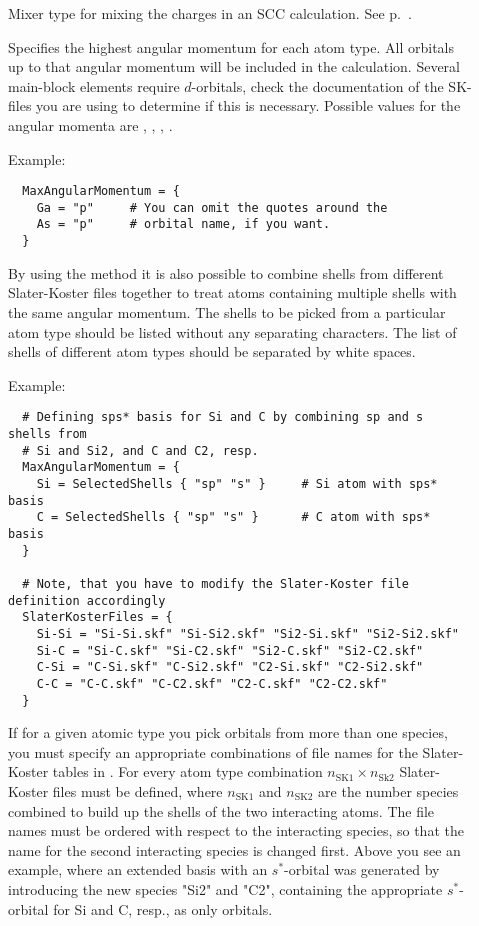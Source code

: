 \begin{description}
\item[]  Mixer type for mixing the charges in an SCC
  calculation. See p.~.

\item[] Specifies the highest angular momentum
  for each atom type. All orbitals up to that angular momentum will be
  included in the calculation. Several main-block elements require
  $d$-orbitals, check the documentation of the SK-files you are using
  to determine if this is necessary. Possible values for the angular
  momenta are , , , .

  Example:
\begin{verbatim}
  MaxAngularMomentum = {
    Ga = "p"     # You can omit the quotes around the
    As = "p"     # orbital name, if you want.
  }
\end{verbatim}

  By using the  method it is also possible to
  combine shells from different Slater-Koster files together to treat
  atoms containing multiple shells with the same angular momentum. The
  shells to be picked from a particular atom type should be listed
  without any separating characters.  The list of shells of different
  atom types should be separated by white spaces.

  Example:
\begin{verbatim}
  # Defining sps* basis for Si and C by combining sp and s shells from
  # Si and Si2, and C and C2, resp.
  MaxAngularMomentum = {
    Si = SelectedShells { "sp" "s" }     # Si atom with sps* basis
    C = SelectedShells { "sp" "s" }      # C atom with sps* basis
  }

  # Note, that you have to modify the Slater-Koster file definition accordingly
  SlaterKosterFiles = {
    Si-Si = "Si-Si.skf" "Si-Si2.skf" "Si2-Si.skf" "Si2-Si2.skf"
    Si-C = "Si-C.skf" "Si-C2.skf" "Si2-C.skf" "Si2-C2.skf"
    C-Si = "C-Si.skf" "C-Si2.skf" "C2-Si.skf" "C2-Si2.skf"
    C-C = "C-C.skf" "C-C2.skf" "C2-C.skf" "C2-C2.skf"
  }
\end{verbatim}

  If for a given atomic type you pick orbitals from more than one species, you
  must specify an appropriate combinations of file names for the Slater-Koster
  tables in . For every
  atom type combination $n_{\text{SK1}}\times n_{\text{Sk2}}$ Slater-Koster
  files must be defined, where $n_{\text{SK1}}$ and $n_{\text{SK2}}$ are the
  number species combined to build up the shells of the two interacting
  atoms. The file names must be ordered with respect to the interacting species,
  so that the name for the second interacting species is changed first. Above
  you see an example, where an extended basis with an $s^*$-orbital was
  generated by introducing the new species "Si2" and "C2", containing the
  appropriate $s^*$-orbital for Si and C, resp., as only orbitals.


\end{description}
